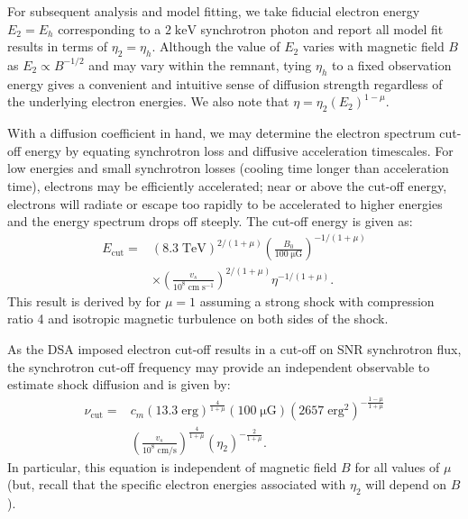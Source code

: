 \documentclass[iop, apj, numberedappendix]{emulateapj}
\newcommand*{\mt}{\mathrm}
\newcommand*{\unit}[1]{\;\mt{#1}}  %
\newcommand*{\Ecut}{E_{\mt{cut}}}
\newcommand*{\muG}{\unit{\mu G}}
\begin{document}
For subsequent analysis and model fitting, we take fiducial electron energy
$E_2 = E_h$ corresponding to a $2 \unit{keV}$ synchrotron photon and report all
model fit results in terms of $\eta_2 = \eta_h$.  Although the value of $E_2$
varies with magnetic field $B$ as $E_2 \propto B^{-1/2}$ and may vary within
the remnant, tying $\eta_h$ to a fixed observation energy gives a convenient
and intuitive sense of diffusion strength regardless of the underlying electron
energies.  We also note that $\eta = \eta_2 (E_2)^{1-\mu}$.

With a diffusion coefficient in hand, we may determine the electron spectrum
cut-off energy by equating synchrotron loss and diffusive acceleration
timescales.  For low energies and small synchrotron losses (cooling time longer
than acceleration time), electrons may be efficiently accelerated; near or
above the cut-off energy, electrons will radiate or escape too rapidly to be
accelerated to higher energies and the energy spectrum drops off steeply.  The
cut-off energy is given as:
\begin{align} \label{eq:ecut}
    \Ecut =
        &\left(8.3\unit{TeV}\right)^{2/(1+\mu)}
        \left(\frac{B_0}{100 \muG}\right)^{-1/(1+\mu)} \nonumber \\
        &\times \left(\frac{v_s}{10^8 \unit{cm\;s^{-1}}}\right)^{2/(1+\mu)}
        \eta^{-1 / (1+\mu)} .
\end{align}
This result is derived by \citet{parizot2006} for $\mu=1$ assuming a strong
shock with compression ratio 4 and isotropic magnetic turbulence on both sides
of the shock.

As the DSA imposed electron cut-off results in a cut-off on SNR synchrotron
flux, the synchrotron cut-off frequency may provide an independent observable
to estimate shock diffusion and is given by:
\begin{align} \label{eq:cutoff}
    \nu_{\mt{cut}} =
        &c_m \left(13.3 \unit{erg}\right)^{\frac{4}{1+\mu}}
        \left(100 \muG\right)
        \left(2657 \unit{erg^2}\right)^{-\frac{1-\mu}{1+\mu}} \nonumber \\
        &\left( \frac{v_s}{10^8 \unit{cm/s}} \right)^{\frac{4}{1+\mu}}
        \left( \eta_2 \right)^{-\frac{2}{1+\mu}} .
\end{align}
In particular, this equation is independent of magnetic field $B$ for all
values of $\mu$ (but, recall that the specific electron energies associated
with $\eta_2$ will depend on $B$).
\end{document}

